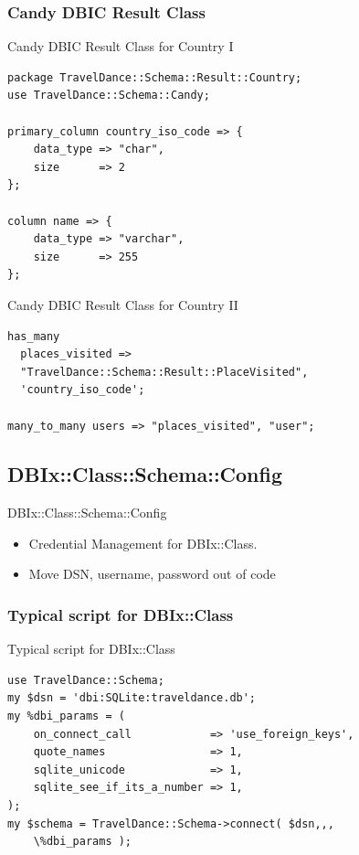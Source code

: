 \subsubsection{Candy DBIC Result Class}

\begin{frame}[fragile]{Candy DBIC Result Class for Country I}
\begin{lstlisting}
package TravelDance::Schema::Result::Country;
use TravelDance::Schema::Candy;

primary_column country_iso_code => {
    data_type => "char",
    size      => 2
};

column name => {
    data_type => "varchar",
    size      => 255
};
\end{lstlisting}
\end{frame}

\begin{frame}[fragile]{Candy DBIC Result Class for Country II}
\begin{lstlisting}
has_many
  places_visited =>
  "TravelDance::Schema::Result::PlaceVisited",
  'country_iso_code';

many_to_many users => "places_visited", "user";
\end{lstlisting}
\end{frame}

\subsection{DBIx::Class::Schema::Config}

\begin{frame}{DBIx::Class::Schema::Config}
\begin{itemize}
\item Credential Management for DBIx::Class.
\item Move DSN, username, password out of code
\end{itemize}
\end{frame}

\subsubsection{Typical script for DBIx::Class}
\begin{frame}[fragile]{Typical script for DBIx::Class}
\begin{lstlisting}
use TravelDance::Schema;
my $dsn = 'dbi:SQLite:traveldance.db';
my %dbi_params = (
    on_connect_call            => 'use_foreign_keys',
    quote_names                => 1,
    sqlite_unicode             => 1,
    sqlite_see_if_its_a_number => 1,
);
my $schema = TravelDance::Schema->connect( $dsn,,, 
    \%dbi_params );
\end{lstlisting}
\end{frame}

